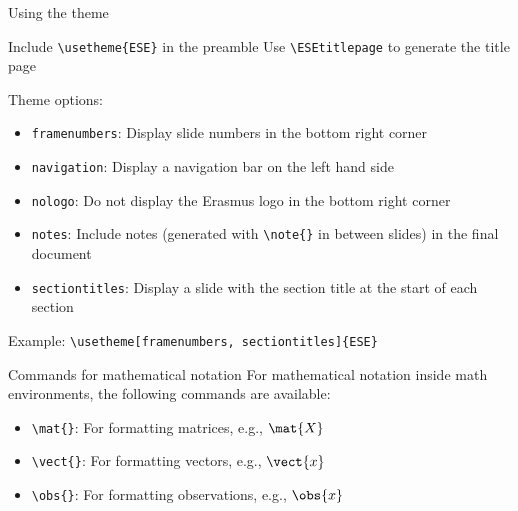\documentclass[pdfpagelabels=false, usepdftitle=false]{beamer}
\begin{document}
\begin{frame}[fragile]{Using the theme}
\vspace{-2ex}
\begin{itemize}
  \arrowitem Include \verb+\usetheme{ESE}+ in the preamble
  \arrowitem Use \verb+\ESEtitlepage+ to generate the title page
\end{itemize}

\vfill

\alert{Theme options}:
\begin{itemize}
  \item \verb+framenumbers+: Display slide numbers in the bottom right corner
  \item \verb+navigation+: Display a navigation bar on the left hand side
  \item \verb+nologo+: Do not display the Erasmus logo in the bottom right
  corner
  \item \verb+notes+: Include notes (generated with \verb+\note{}+ in between
  slides) in the final document
  \item \verb+sectiontitles+: Display a slide with the section title at the
  start of each section
\end{itemize}

\alert{Example}: \verb+\usetheme[framenumbers, sectiontitles]{ESE}+
\end{frame}


\begin{frame}[fragile]{Commands for mathematical notation}
For mathematical notation inside math environments, the following commands are
available:

\bigskip
\begin{itemize}
  \item \verb+\mat{}+: For formatting matrices, e.g., $\mat{X}$
  \medskip
  \item \verb+\vect{}+: For formatting vectors, e.g., $\vect{x}$
  \medskip
  \item \verb+\obs{}+: For formatting observations, e.g., $\obs{x}$
\end{itemize}
\end{frame}
\end{document}
